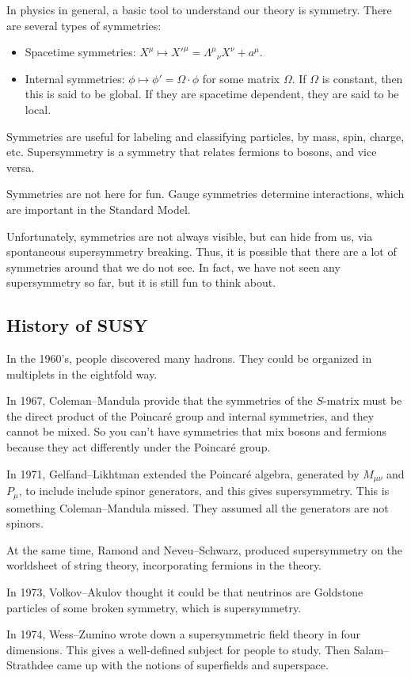 \documentclass[a4paper]{article}
\begin{document}
In physics in general, a basic tool to understand our theory is symmetry. There are several types of symmetries:
\begin{itemize}
  \item Spacetime symmetries: $X^\mu \mapsto X'^\mu = \Lambda^\mu\!_\nu X^\nu + a^\mu$.
  \item Internal symmetries: $\phi \mapsto \phi' = \Omega \cdot \phi$ for some matrix $\Omega$. If $\Omega$ is constant, then this is said to be global. If they are spacetime dependent, they are said to be local.
\end{itemize}
Symmetries are useful for labeling and classifying particles, by mass, spin, charge, etc. Supersymmetry is a symmetry that relates fermions to bosons, and vice versa.

Symmetries are not here for fun. Gauge symmetries determine interactions, which are important in the Standard Model.

Unfortunately, symmetries are not always visible, but can hide from us, via spontaneous supersymmetry breaking. Thus, it is possible that there are a lot of symmetries around that we do not see. In fact, we have not seen any supersymmetry so far, but it is still fun to think about.
\subsection{History of SUSY}
In the 1960's, people discovered many hadrons. They could be organized in multiplets in the eightfold way.

In 1967, Coleman--Mandula provide that the symmetries of the $S$-matrix must be the direct product of the Poincar\'e group and internal symmetries, and they cannot be mixed. So you can't have symmetries that mix bosons and fermions because they act differently under the Poincar\'e group.

In 1971, Gelfand--Likhtman extended the Poincar\'e algebra, generated by $M_{\mu \nu}$ and $P_\mu$, to include include spinor generators, and this gives supersymmetry. This is something Coleman--Mandula missed. They assumed all the generators are not spinors.

At the same time,  Ramond and Neveu--Schwarz, produced supersymmetry on the worldsheet of string theory, incorporating fermions in the theory.

In 1973, Volkov--Akulov thought it could be that neutrinos are Goldstone particles of some broken symmetry, which is supersymmetry.

In 1974, Wess--Zumino wrote down a supersymmetric field theory in four dimensions. This gives a well-defined subject for people to study. Then Salam--Strathdee came up with the notions of superfields and superspace.
\end{document}
